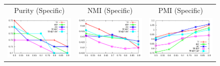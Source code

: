 \documentclass[10pt,a5paper,twoside]{article}
\begin{document}
\begin{figure}[t!]
\begin{center}
{\begin{tabular}{ccc}
		{\LARGE Purity (Specific)} & {\LARGE NMI (Specific)} & 
		{\LARGE PMI (Specific)}\\


		\includegraphics[width=350pt]{Figs/3-1.pdf} & 
		\includegraphics[width=350pt]{Figs/3-2.pdf} & 
		\includegraphics[width=350pt]{Figs/3-3.pdf} \\


\end{tabular}}
\end{center}
\end{figure}
\end{document}
